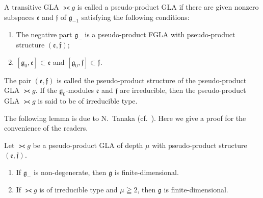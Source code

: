 A transitive GLA $\gla g$ is called a pseudo-product GLA
if there are given nonzero subspaces $\mathfrak e$ and $\mathfrak f$ of $\mathfrak g_{-1}$ satisfying the following conditions:
\begin{enumerate}\itemsep=0pt
\renewcommand{\labelenumi}{$(\roman{enumi})$}
\item The negative part $\mathfrak g_{-}$ is
a pseudo-product
FGLA with pseudo-product structure
$(\mathfrak e,\mathfrak f)$;
\item $[\mathfrak g_0,\mathfrak e]\subset \mathfrak e$
and $[\mathfrak g_0,\mathfrak f]\subset \mathfrak f$.
\end{enumerate}
The pair $(\mathfrak e,\mathfrak f)$ is called the pseudo-product structure of
 the pseudo-product GLA
$\gla g$.
If the $\mathfrak g_0$-modules $\mathfrak e$ and $\mathfrak f$ are
irreducible,
then the pseudo-product GLA $\gla g$ is said to be
of irreducible type.

The following lemma is due to N.~Tanaka (cf.~\cite{tan89:01}).
Here we give a proof for the convenience of the readers.
\begin{lemma}\label{lemma8.1} Let $\gla g$ be a pseudo-product GLA of
depth $\mu$ with pseudo-product structure~$(\mathfrak e,\mathfrak f)$.
\begin{enumerate}\itemsep=0pt
\item If $\mathfrak g_-$ is non-degenerate,
then $\mathfrak g$ is finite-dimensional.
\item If $\gla g$ is of irreducible type and $\mu\geqq2$, then
$\mathfrak g$ is finite-dimensional.
\end{enumerate}
\end{lemma}

